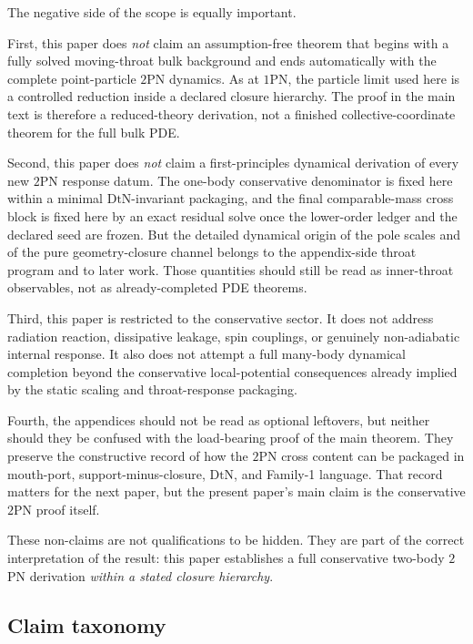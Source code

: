 \documentclass[11pt]{article}
\newcommand{\TwoPN}{\mathrm{2PN}}
\newcommand{\DtN}{\mathrm{DtN}}
\begin{document}
The negative side of the scope is equally important.

First, this paper does \emph{not} claim an assumption-free theorem that begins with a fully solved moving-throat bulk background and ends automatically with the complete point-particle $\TwoPN$ dynamics.
As at $1$PN, the particle limit used here is a controlled reduction inside a declared closure hierarchy.
The proof in the main text is therefore a reduced-theory derivation, not a finished collective-coordinate theorem for the full bulk PDE.

Second, this paper does \emph{not} claim a first-principles dynamical derivation of every new $\TwoPN$ response datum.
The one-body conservative denominator is fixed here within a minimal $\DtN$-invariant packaging, and the final comparable-mass cross block is fixed here by an exact residual solve once the lower-order ledger and the declared seed are frozen.
But the detailed dynamical origin of the pole scales and of the pure geometry-closure channel belongs to the appendix-side throat program and to later work.
Those quantities should still be read as inner-throat observables, not as already-completed PDE theorems.

Third, this paper is restricted to the conservative sector.
It does not address radiation reaction, dissipative leakage, spin couplings, or genuinely non-adiabatic internal response.
It also does not attempt a full many-body dynamical completion beyond the conservative local-potential consequences already implied by the static scaling and throat-response packaging.

Fourth, the appendices should not be read as optional leftovers, but neither should they be confused with the load-bearing proof of the main theorem.
They preserve the constructive record of how the $2$PN cross content can be packaged in mouth-port, support-minus-closure, $\DtN$, and Family-1 language.
That record matters for the next paper, but the present paper's main claim is the conservative $2$PN proof itself.

These non-claims are not qualifications to be hidden.
They are part of the correct interpretation of the result:
this paper establishes a full conservative two-body $2$PN derivation \emph{within a stated closure hierarchy}.

\subsection{Claim taxonomy}
\label{sec:intro-taxonomy}
\end{document}
